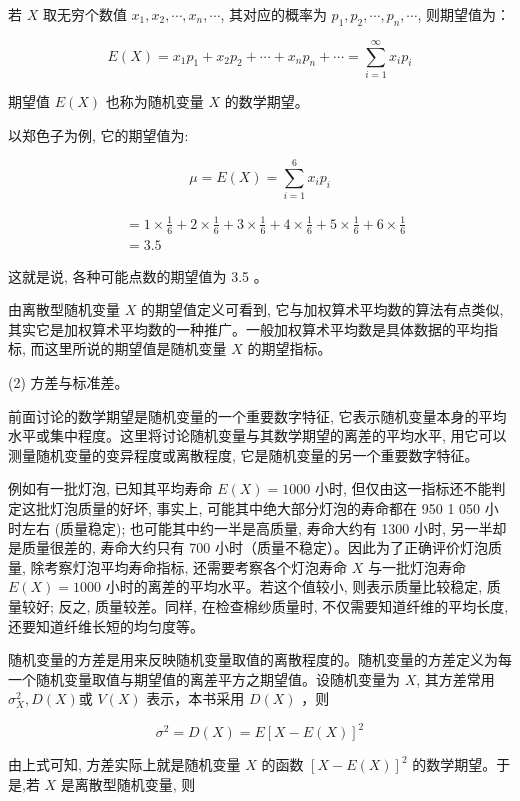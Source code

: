 \documentclass[10pt]{article}
\begin{document}
\begin{CJK*}{UTF8}{bsmi}
若 $X$ 取无穷个数值 $x_{1}, x_{2}, \cdots, x_{n}, \cdots$, 其对应的概率为 $p_{1}, p_{2}, \cdots, p_{n}, \cdots$, 则期望值为：


\begin{equation*}
E(X)=x_{1} p_{1}+x_{2} p_{2}+\cdots+x_{n} p_{n}+\cdots=\sum_{i=1}^{\infty} x_{i} p_{i} \tag{5.4}
\end{equation*}


期望值 $E(X)$ 也称为随机变量 $X$ 的数学期望。

以郑色子为例, 它的期望值为:

$$
\mu=E(X)=\sum_{i=1}^{6} x_{i} p_{i}
$$

$$
\begin{aligned}
& =1 \times \frac{1}{6}+2 \times \frac{1}{6}+3 \times \frac{1}{6}+4 \times \frac{1}{6}+5 \times \frac{1}{6}+6 \times \frac{1}{6} \\
& =3.5
\end{aligned}
$$

这就是说, 各种可能点数的期望值为 3.5 。

由离散型随机变量 $X$ 的期望值定义可看到, 它与加权算术平均数的算法有点类似,其实它是加权算术平均数的一种推广。一般加权算术平均数是具体数据的平均指标, 而这里所说的期望值是随机变量 $X$ 的期望指标。

(2) 方差与标准差。

前面讨论的数学期望是随机变量的一个重要数字特征, 它表示随机变量本身的平均水平或集中程度。这里将讨论随机变量与其数学期望的离差的平均水平, 用它可以测量随机变量的变异程度或离散程度, 它是随机变量的另一个重要数字特征。

例如有一批灯泡, 已知其平均寿命 $E(X)=1000$ 小时, 但仅由这一指标还不能判定这批灯泡质量的好坏, 事实上, 可能其中绝大部分灯泡的寿命都在 950 1 050 小时左右 (质量稳定); 也可能其中约一半是高质量, 寿命大约有 1300 小时, 另一半却是质量很差的, 寿命大约只有 700 小时（质量不稳定）。因此为了正确评价灯泡质量, 除考察灯泡平均寿命指标, 还需要考察各个灯泡寿命 $X$ 与一批灯泡寿命 $E(X)=1000$ 小时的离差的平均水平。若这个值较小, 则表示质量比较稳定, 质量较好; 反之, 质量较差。同样, 在检查棉纱质量时, 不仅需要知道纤维的平均长度, 还要知道纤维长短的均匀度等。

随机变量的方差是用来反映随机变量取值的离散程度的。随机变量的方差定义为每一个随机变量取值与期望值的离差平方之期望值。设随机变量为 $X$, 其方差常用 $\sigma_{X}^{2}, D(X)$或 $V(X)$ 表示，本书采用 $D(X)$ ，则

$$
\sigma^{2}=D(X)=E[X-E(X)]^{2}
$$

由上式可知, 方差实际上就是随机变量 $X$ 的函数 $[X-E(X)]^{2}$ 的数学期望。于是,若 $X$ 是离散型随机变量, 则



\end{CJK*}
\end{document}
